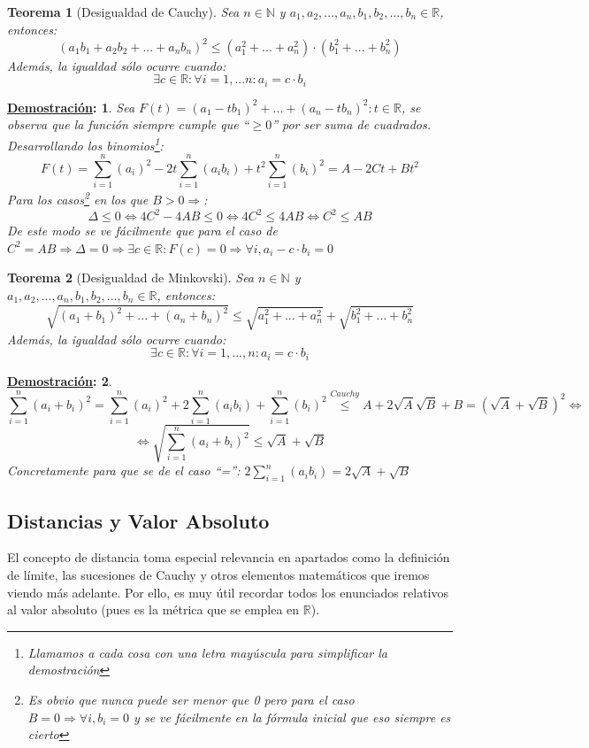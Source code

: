 \documentclass[10pt,a4paper,openright]{book}
\theoremstyle{break}
\newtheorem*{theo}{Teorema}
\newtheorem*{demo}{\underline{Demostración}:}
\begin{document}
\begin{theo}[Desigualdad de Cauchy]
Sea $n\in \mathbb N$ y $a_1, a_2, ..., a_n, b_1, b_2, ..., b_n\in \mathbb R$, entonces:
$$(a_1b_1+a_2b_2+...+a_nb_n)^2 \leq (a_1^2+...+a_n^2)\cdot (b_1^2+...+b_n^2)$$
Además, la igualdad sólo ocurre cuando:
$$\exists c\in \mathbb R : \forall i=1,...n :a_i=c\cdot b_i$$
\end{theo}
\begin{demo}
Sea $F(t)=(a_1-tb_1)^2+...+(a_n-tb_n)^2 : t\in \mathbb R$, se observa que la función siempre cumple que ``$\geq 0$'' por ser suma de cuadrados. Desarrollando los binomios\footnote{Llamamos a cada cosa con una letra mayúscula para simplificar la demostración}:
$$F(t)=\sum_{i=1}^n (a_i)^2 -2t\sum_{i=1}^n (a_ib_i) + t^2\sum_{i=1}^n (b_i)^2=A-2Ct+Bt^2$$
Para los casos\footnote{Es obvio que nunca puede ser menor que 0 pero para el caso $B=0\Rightarrow \forall i, b_i=0$ y se ve fácilmente en la fórmula inicial que eso siempre es cierto} en los que $B>0\Rightarrow$:
$$\Delta\leq 0\Leftrightarrow 4C^2-4AB\leq 0\Leftrightarrow 4C^2\leq 4AB\Leftrightarrow C^2\leq AB$$
De este modo se ve fácilmente que para el caso de $C^2=AB\Rightarrow \Delta=0\Rightarrow \exists c\in \mathbb R : F(c)=0\Rightarrow \forall  i, a_i-c\cdot b_i=0$
\end{demo}

\begin{theo}[Desigualdad de Minkovski]
Sea $n\in \mathbb N$ y $a_1, a_2, ..., a_n, b_1, b_2, ..., b_n\in \mathbb R$, entonces:
$$\sqrt{(a_1+b_1)^2+...+(a_n+b_n)^2}\leq \sqrt{a_1^2+...+a_n^2}+\sqrt{b_1^2+...+b_n^2}$$
Además, la igualdad sólo ocurre cuando:
$$\exists c\in \mathbb R : \forall i=1,...,n : a_i=c\cdot b_i$$
\end{theo}
\begin{demo}
$$\sum_{i=1}^n (a_i+b_i)^2=\sum_{i=1}^n (a_i)^2+2\sum_{i=1}^n (a_ib_i)+ \sum_{i=1}^n (b_i)^2\stackrel{Cauchy}{\leq}A+2\sqrt{A}\sqrt{B}+B=(\sqrt{A}+\sqrt{B})^2\Leftrightarrow$$
$$\Leftrightarrow \sqrt{\sum_{i=1}^n (a_i+b_i)^2}\leq \sqrt{A}+\sqrt{B}$$
Concretamente para que se de el caso ``='': $2\sum_{i=1}^n (a_ib_i)=2\sqrt{A}+\sqrt{B}$
\end{demo}

\subsection{Distancias y Valor Absoluto}
El concepto de distancia toma especial relevancia en apartados como la definición de límite, las sucesiones de Cauchy y otros elementos matemáticos que iremos viendo más adelante. Por ello, es muy útil recordar todos los enunciados relativos al valor absoluto (pues es la métrica que se emplea en $\mathbb{R}$).
\end{document}
